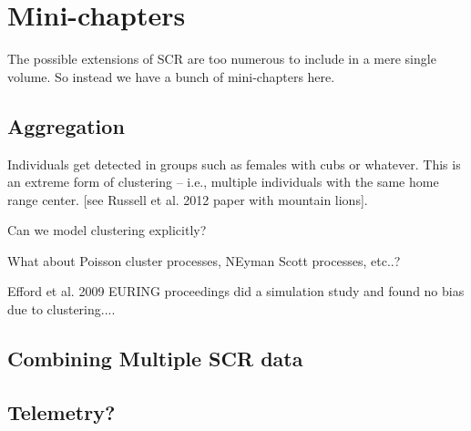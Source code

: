 \chapter{
Mini-chapters
}
\label{chapt.othertopics}


\vspace{.3in}



The possible extensions of SCR are too numerous to include in a mere
single volume.
So instead we have a bunch of mini-chapters here.



\section{Aggregation}

Individuals get detected in groups such as females with cubs or
whatever.
This is an extreme form of clustering -- i.e., multiple individuals
with the same home range center.
[see Russell et al. 2012 paper with mountain lions].

Can we model clustering explicitly?

What about Poisson cluster processes, NEyman Scott processes, etc..?

Efford et al. 2009 EURING proceedings did a simulation study and found
no bias due to clustering....







\section{Combining Multiple SCR data}

\section{Telemetry?}


